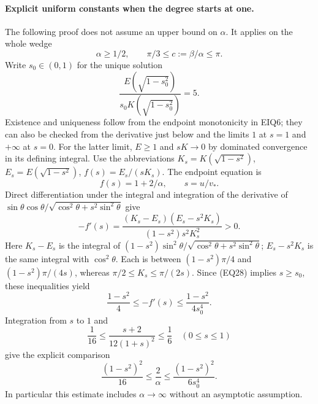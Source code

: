 \paragraph{Explicit uniform constants when the degree starts at one.}
The following proof does not assume an upper bound on \(\alpha\).
It applies on the whole wedge
\[
 \alpha\ge1/2,\qquad \pi/3\le c:=\beta/\alpha\le\pi.
\tag{EQ28}
\]
Write \(s_0\in(0,1)\) for the unique solution
\[
 \frac{E(\sqrt{1-s_0^2})}
      {s_0K(\sqrt{1-s_0^2})}=5.
\tag{EQ29}
\]
Existence and uniqueness follow from the endpoint monotonicity in
EIQ6; they can also be checked from the derivative just below and the
limits \(1\) at \(s=1\) and \(+\infty\) at \(s=0\).
For the latter limit, \(E\ge1\) and
\(sK\to0\) by dominated convergence in its defining integral.
Use the abbreviations
\(K_s=K(\sqrt{1-s^2})\), \(E_s=E(\sqrt{1-s^2})\), \(f(s)=E_s/(sK_s)\).
The endpoint equation is
\[
 f(s)=1+2/\alpha,\qquad s=u/v_*.
\]
Direct differentiation under the integral and integration of the derivative
of \(\sin\theta\cos\theta/
\sqrt{\cos^2\theta+s^2\sin^2\theta}\) give
\[
 -f'(s)=
 \frac{(K_s-E_s)(E_s-s^2K_s)}
      {(1-s^2)s^2K_s^2}>0.
\tag{EQ30}
\]
Here \(K_s-E_s\) is the integral of
\((1-s^2)\sin^2\theta/
\sqrt{\cos^2\theta+s^2\sin^2\theta}\);
\(E_s-s^2K_s\) is the same integral with \(\cos^2\theta\).
Each is between \((1-s^2)\pi/4\) and
\((1-s^2)\pi/(4s)\), whereas
\(\pi/2\le K_s\le\pi/(2s)\).
Since (EQ28) implies \(s\ge s_0\), these inequalities yield
\[
 \frac{1-s^2}{4}\le-f'(s)
       \le\frac{1-s^2}{4s_0^4}.
\]
Integration from \(s\) to \(1\) and
\[
 \frac1{16}\le\frac{s+2}{12(1+s)^2}\le\frac16
       \quad(0\le s\le1)
\]
give the explicit comparison
\[
 \frac{(1-s^2)^2}{16}\le\frac2\alpha
       \le\frac{(1-s^2)^2}{6s_0^4}.
\tag{EQ31}
\]
In particular this estimate includes \(\alpha\to\infty\) without
an asymptotic assumption.

